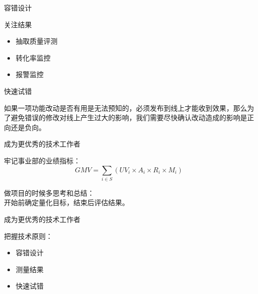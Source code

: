 \documentclass{beamer}
\begin{document}
\begin{CJK}{UTF8}{gbsn}
\begin{frame}{容错设计}
\end{frame}


\begin{frame}{关注结果}

\begin{itemize}
  \item { 抽取质量评测 }
  \item { 转化率监控 }
  \item { 报警监控 }
\end{itemize}

\end{frame}

\begin{frame}{快速试错}

如果一项功能改动是否有用是无法预知的，必须发布到线上才能收到效果，那么为了避免错误的修改对线上产生过大的影响，我们需要尽快确认改动造成的影响是正向还是负向。

\end{frame}

\begin{frame}{成为更优秀的技术工作者}

  牢记事业部的业绩指标：
  $$  GMV = \sum_{i \in S}{(UV_i \times A_i \times R_i \times M_i)} $$

  做项目的时候多思考和总结：\\ 
  开始前确定量化目标，结束后评估结果。

\end{frame}

\begin{frame}{成为更优秀的技术工作者}

  把握技术原则：
  \begin{itemize}
    \item {容错设计}
    \item {测量结果}
    \item {快速试错}
  \end{itemize}

\end{frame}



\end{CJK}
\end{document}
